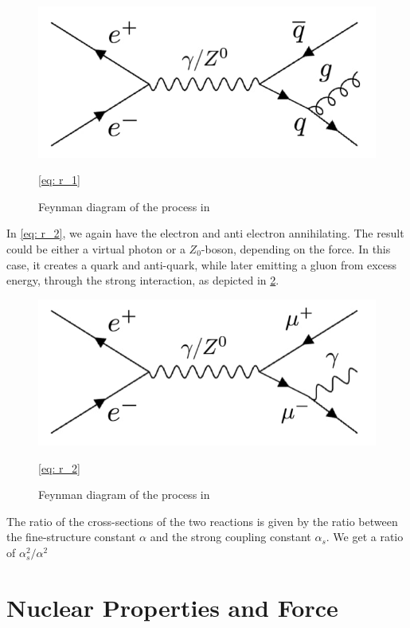 \documentclass{article}
\begin{document}
\begin{figure}[ht!]
\centering
\includegraphics[width = .9\textwidth]{1b1.jpeg}
\caption{Feynman diagram of the process in} \cref{eq: r_1}
\label{fig: 1b1}
\end{figure}


In \cref{eq: r_2}, we again have the electron and anti electron annihilating. The result could be either a virtual photon or a $Z_0$-boson, depending on the force. In this case, it creates a quark and anti-quark, while later emitting a gluon from excess energy, through the strong interaction, as depicted in \cref{fig: 1b2}.
\begin{figure}[ht!]
\centering
\includegraphics[width = .95\textwidth]{1b2.jpeg}
\caption{Feynman diagram of the process in} \cref{eq: r_2}
\label{fig: 1b2}
\end{figure}

The ratio of the cross-sections of the two reactions is given by the ratio between the fine-structure constant $α$ and the strong coupling constant $α_s$. We get a ratio of $α_s^2 / α^2$



\section{Nuclear Properties and Force}
\end{document}

